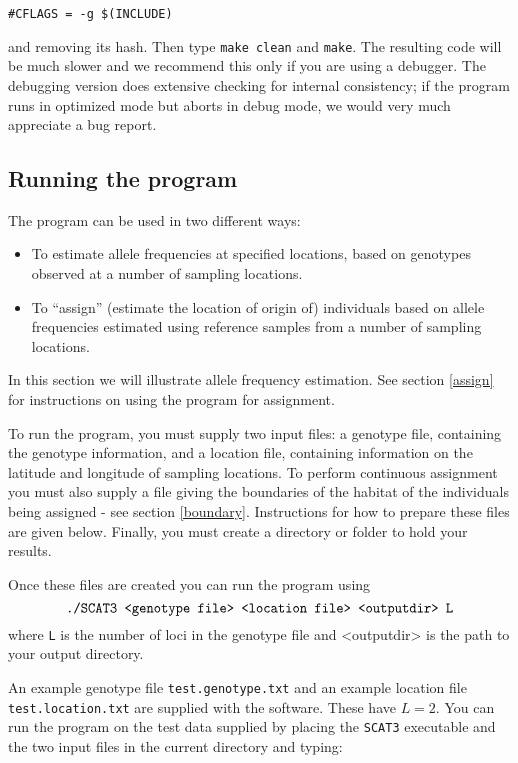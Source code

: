 \documentclass[10pt,titlepage,times,letterpaper]{article}
\def\SCAT{{\tt SCAT3} }
\begin{document}
\begin{verbatim}
#CFLAGS = -g $(INCLUDE)
\end{verbatim}

and removing its hash.  Then type {\tt make clean} and {\tt make}.   
The resulting code will be much slower and we recommend this only if you 
are using a debugger.  The debugging version does extensive checking for internal
consistency; if the program runs in optimized mode but aborts in 
debug mode, we would very much appreciate a bug report.

\subsection{Running the program}

The program can be used in two different ways:
\begin{itemize}
\item To estimate allele frequencies at specified
locations, based on genotypes observed at a number of sampling
locations.
\item To ``assign'' (estimate the location of origin of)
individuals based on allele
frequencies estimated using reference samples from a number of
sampling locations.
\end{itemize}

In this section we will illustrate allele frequency estimation.
See section \ref{assign} for
instructions on using the program for assignment.

To run the program, you must supply two input files: a genotype file,
containing the genotype information, and a location file, containing
information on the latitude and longitude of sampling locations. To
perform continuous assignment you must also supply a file giving the
boundaries of the habitat of the individuals being assigned - see
section \ref{boundary}.  Instructions for how to prepare these files
are given below. Finally, you must create a directory or folder to hold your results.

Once these files are created you can run the program
using
$$\text{{\tt ./SCAT3 <genotype file> <location file> <outputdir> L}}$$ 
where {\tt L} is the number of loci in the genotype file and <outputdir>
is the path to your output directory.

An example genotype file {\tt test.genotype.txt}
and an example location file {\tt test.location.txt} are supplied with
the software.  These have $L=2$.  You can run the program on the test data supplied by placing
the \SCAT executable and the two input files in the current directory and typing:
\end{document}
